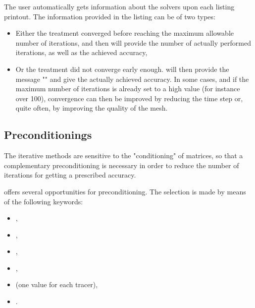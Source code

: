 The user automatically gets information about the solvers upon each listing
printout. The information provided in the listing can be of two types:

\begin{itemize}
\item Either the treatment converged before reaching the maximum allowable
number of iterations, and then  will provide the number of actually
performed iterations, as well as the achieved accuracy,

\item Or the treatment did not converge early enough.  will then
provide the message "" and give
the actually achieved accuracy. In some cases, and if the maximum number of
iterations is already set to a high value (for instance over 100), convergence
can then be improved by reducing the time step or, quite often, by improving
the quality of the mesh.
\end{itemize}


\subsection{Preconditionings}
\label{sec:precond}
The iterative methods are sensitive to the "conditioning" of matrices, so that
a complementary preconditioning is necessary in order to reduce the number of
iterations for getting a prescribed accuracy.

 offers several opportunities for preconditioning. The selection is
made by means of the following keywords:

\begin{itemize}
\item {},

\item {},

\item {},

\item {},

\item {} (one value for each
tracer),

\item {}.
\end{itemize}


